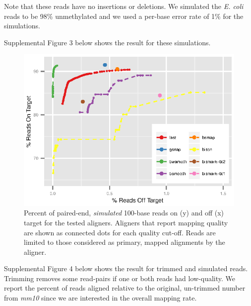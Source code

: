 \documentclass[12pt]{article}
\begin{document}
Note that these reads have no insertions or deletions. We simulated the 
\emph{E. coli} reads to be 98\% unmethylated and we used a per-base error
rate of 1\% for the simulations.

Supplemental Figure 3 below shows the result for these simulations.

\begin{figure}[H]%
    \centerline{\includegraphics[width=125mm]{sim-quals.eps}}
    \caption{Percent of paired-end, \emph{simulated} 100-base reads on (y) and off (x)
    target for the tested aligners. Aligners that report mapping quality are shown as
    connected dots for each quality cut-off. Reads are limited to those considered as
    primary, mapped alignments by the aligner.
}\label{suppfig:03}
\end{figure}

Supplemental Figure 4 below shows the result for trimmed and simulated reads.
Trimming removes some read-pairs if one or both reads had low-quality. We
report the percent of reads aligned relative to the original, 
un-trimmed number from \emph{mm10} since we are interested in the overall
mapping rate.
\end{document}
